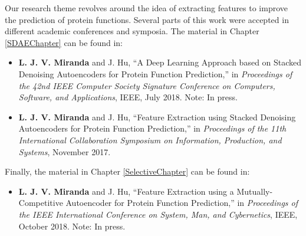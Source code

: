%
%
%
%
%

\par Our research theme revolves around the idea of extracting features to
improve the prediction of protein functions. Several parts of this work were
accepted in different academic conferences and symposia. The material in
Chapter \ref{SDAEChapter} can be found in:

\begin{itemize}
    \item \textbf{L. J. V. Miranda} and J. Hu, ``A Deep Learning Approach based
    on Stacked Denoising Autoencoders for Protein Function Prediction,'' in
    \textit{Proceedings of the 42nd IEEE Computer Society Signature Conference
    on Computers, Software, and Applications}, IEEE, July 2018. Note: In press.
    \item \textbf{L. J. V. Miranda} and  J. Hu, ``Feature Extraction using Stacked
    Denoising Autoencoders for Protein Function Prediction,'' in \textit{Proceedings of
    the 11th International Collaboration Symposium on Information, Production,
    and Systems}, November 2017.
\end{itemize}

\par Finally, the material in Chapter \ref{SelectiveChapter} can be found in:

\begin{itemize}
    \item \textbf{L. J. V. Miranda} and J. Hu, ``Feature Extraction using a
    Mutually-Competitive Autoencoder for Protein Function Prediction,'' in
    \textit{Proceedings of the IEEE International Conference on System, Man,
    and Cybernetics}, IEEE, October 2018. Note: In press.
\end{itemize}
